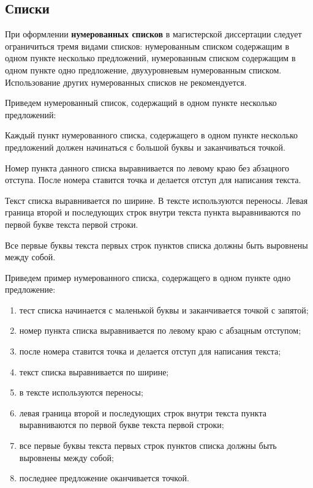 \documentclass[12pt,a4paper, oneside]{extreport}
\begin{document}
 
\subsection{Списки}

При оформлении \textbf{нумерованных списков} в магистерской диссертации следует ограничиться тремя видами списков: нумерованным списком содержащим в одном пункте несколько предложений, нумерованным списком содержащим в одном пункте одно предложение, двухуровневым нумерованным списком. Использование других  нумерованных списков не рекомендуется.

Приведем нумерованный список, содержащий в одном пункте несколько предложений:
\begin{Enumerate}
\item 	Каждый пункт нумерованного списка, содержащего в одном пункте несколько предложений должен начинаться с большой буквы и заканчиваться точкой.
\item 	Номер пункта данного списка выравнивается по левому краю без абзацного отступа. После номера ставится точка и делается отступ для написания текста. 
\item Текст списка выравнивается по ширине. В тексте используются переносы. Левая граница второй и последующих строк внутри текста пункта выравниваются по первой букве текста первой строки.
\item Все первые буквы текста первых строк пунктов списка должны быть выровнены между собой.
\end{Enumerate}


Приведем пример нумерованного списка, содержащего в одном пункте одно предложение:
	\begin{enumerate}
		\item тест списка начинается с маленькой буквы и заканчивается точкой с запятой;
		\item номер пункта списка выравнивается по левому краю с абзацным отступом;
		\item после номера ставится точка и делается отступ для написания текста;
		\item текст списка выравнивается по ширине; 
		\item в тексте используются переносы; 
		\item левая граница второй и последующих строк внутри текста пункта выравниваются по первой букве текста первой строки;
		\item все первые буквы текста первых строк пунктов списка должны быть выровнены между собой;
		\item последнее предложение оканчивается точкой.		
	\end{enumerate} 
\end{document}
